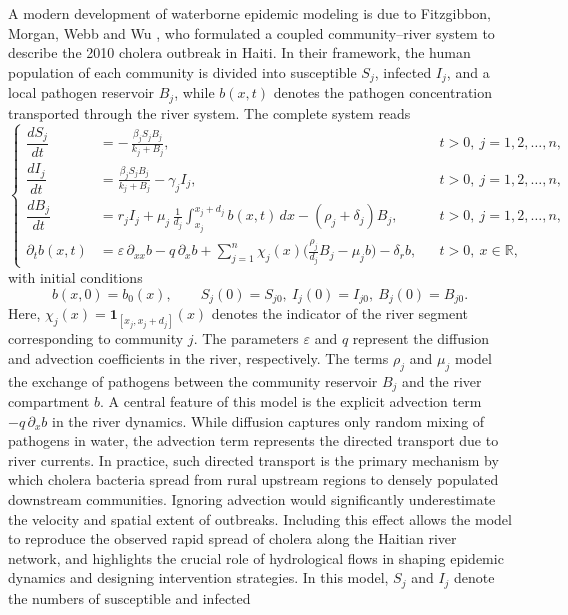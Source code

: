 \documentclass[a4paper,11pt]{amsart}
\theoremstyle{definition}
\numberwithin{equation}{section}
\theoremstyle{definition}
\begin{document}
A modern development of waterborne epidemic modeling is due to Fitzgibbon,
Morgan, Webb and Wu \cite{Fitzgibbon2020}, who formulated a coupled
community--river system to describe the 2010 cholera outbreak in Haiti. In
their framework, the human population of each community is divided into
susceptible $S_j$, infected $I_j$, and a local pathogen reservoir $B_j$,
while $b(x,t)$ denotes the pathogen concentration transported through the
river system. The complete system reads
\begin{equation}\label{eq:fitzgibbon-haiti}
\left\{
\begin{aligned}
\dfrac{dS_j}{dt} &= -\,\frac{\beta_j S_j B_j}{k_j+B_j},
&& t>0,\ j=1,2,\dots,n, \\[0.6em]
\dfrac{dI_j}{dt} &= \frac{\beta_j S_j B_j}{k_j+B_j} - \gamma_j I_j,
&& t>0,\ j=1,2,\dots,n, \\[0.6em]
\dfrac{dB_j}{dt} &= r_j I_j
+ \mu_j\,\frac{1}{d_j}\!\int_{x_j}^{x_j+d_j}\! b(x,t)\,dx
- (\rho_j+\delta_j)B_j,
&& t>0,\ j=1,2,\dots,n, \\[0.8em]
\partial_t b(x,t) &= \varepsilon\,\partial_{xx} b - q\,\partial_x b
+ \sum_{j=1}^n \chi_j(x)\Big(\tfrac{\rho_j}{d_j}B_j - \mu_j b\Big) - \delta_r b,
&& t>0,\ x\in\mathbb{R},
\end{aligned}
\right.
\end{equation}
with initial conditions
\[
b(x,0)=b_0(x), \qquad S_j(0)=S_{j0},\ I_j(0)=I_{j0},\ B_j(0)=B_{j0}.
\]
Here, $\chi_j(x)=\mathbf{1}_{[x_j,x_j+d_j]}(x)$ denotes the indicator of the
river segment corresponding to community $j$. The parameters $\varepsilon$ and
$q$ represent the diffusion and advection coefficients in the river,
respectively. The terms $\rho_j$ and $\mu_j$ model the exchange of pathogens
between the community reservoir $B_j$ and the river compartment $b$. A central feature of this model is the explicit advection term
$-q\,\partial_x b$ in the river dynamics. While diffusion captures only random
mixing of pathogens in water, the advection term represents the directed
transport due to river currents. In practice, such directed transport is the
primary mechanism by which cholera bacteria spread from rural upstream regions
to densely populated downstream communities. Ignoring advection would
significantly underestimate the velocity and spatial extent of outbreaks.
Including this effect allows the model to reproduce the observed rapid spread
of cholera along the Haitian river network, and highlights the crucial role of
hydrological flows in shaping epidemic dynamics and designing intervention
strategies. In this model, $S_j$ and $I_j$ denote the numbers of susceptible and infected
\end{document}
